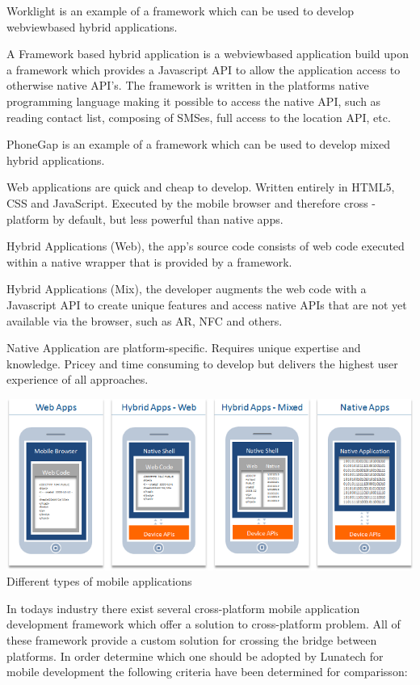 Worklight is an example of a framework which can be used to develop webviewbased hybrid applications.

A Framework based hybrid application is a webviewbased application build upon a framework which provides a Javascript API to allow the application access to otherwise native API's. The framework is written in the platforms native programming language making it possible to access the native API, such as reading contact list, composing of SMSes, full access to the location API, etc.

PhoneGap is an example of a framework which can be used to develop mixed hybrid applications.

Web applications are quick and cheap to develop. Written entirely in HTML5, CSS and JavaScript. Executed by the mobile
browser and therefore cross - platform by default, but less powerful than native apps.
 
Hybrid Applications (Web), the app's source code consists of web code executed within a native wrapper that is provided by a framework.
 
Hybrid Applications (Mix), the developer augments the web code with a Javascript API to create unique features and
access native APIs that are not yet available via the browser, such as AR, NFC and others.
 
Native Application are platform-specific. Requires unique expertise and knowledge. Pricey and time consuming to develop but
 delivers the highest user experience of all approaches.

\begin{centering}
\includegraphics[scale=0.5]{images/apptypesdefined.png}\\{Different types of mobile applications\cite{IBM-Worklight2012}}\\
\end{centering}

In todays industry there exist several cross-platform mobile application development framework which offer a solution to cross-platform problem. All of these framework provide a custom solution for crossing the bridge between platforms. In order determine which one should be adopted by Lunatech for mobile development the following criteria have been determined for comparisson:

